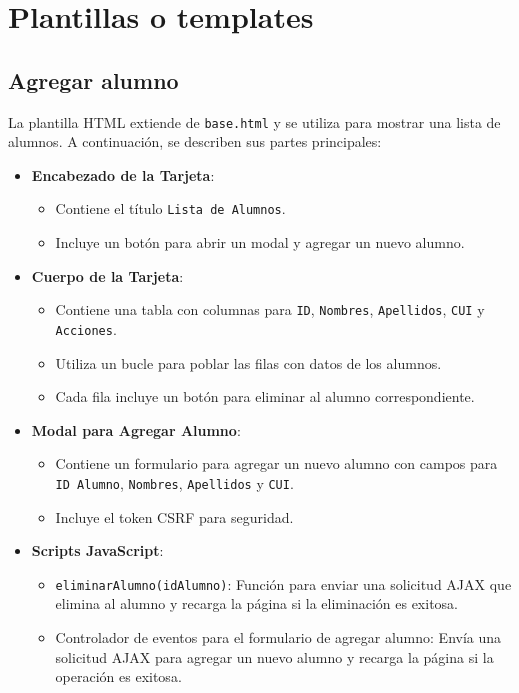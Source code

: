 \documentclass{article}
\begin{document}
\vspace{1cm}


  	\section{Plantillas o templates}
\subsection{Agregar alumno}
La plantilla HTML extiende de \texttt{base.html} y se utiliza para mostrar una lista de alumnos. A continuación, se describen sus partes principales:

\begin{itemize}
    \item \textbf{Encabezado de la Tarjeta}:
    \begin{itemize}
        \item Contiene el título \texttt{Lista de Alumnos}.
        \item Incluye un botón para abrir un modal y agregar un nuevo alumno.
    \end{itemize}

    \item \textbf{Cuerpo de la Tarjeta}:
    \begin{itemize}
        \item Contiene una tabla con columnas para \texttt{ID}, \texttt{Nombres}, \texttt{Apellidos}, \texttt{CUI} y \texttt{Acciones}.
        \item Utiliza un bucle para poblar las filas con datos de los alumnos.
        \item Cada fila incluye un botón para eliminar al alumno correspondiente.
    \end{itemize}

    \item \textbf{Modal para Agregar Alumno}:
    \begin{itemize}
        \item Contiene un formulario para agregar un nuevo alumno con campos para \texttt{ID Alumno}, \texttt{Nombres}, \texttt{Apellidos} y \texttt{CUI}.
        \item Incluye el token CSRF para seguridad.
    \end{itemize}

    \item \textbf{Scripts JavaScript}:
    \begin{itemize}
        \item \texttt{eliminarAlumno(idAlumno)}: Función para enviar una solicitud AJAX que elimina al alumno y recarga la página si la eliminación es exitosa.
        \item Controlador de eventos para el formulario de agregar alumno: Envía una solicitud AJAX para agregar un nuevo alumno y recarga la página si la operación es exitosa.
    \end{itemize}
\end{itemize}
\end{document}
